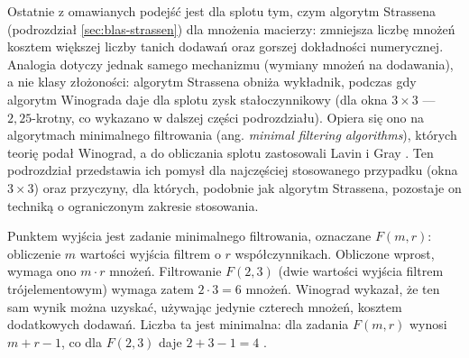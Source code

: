 \documentclass[a4paper,12pt]{book} %
\begin{document}
Ostatnie z omawianych podejść jest dla splotu tym, czym algorytm Strassena (podrozdział \ref{sec:blas-strassen}) dla mnożenia macierzy: zmniejsza liczbę mnożeń kosztem większej liczby tanich dodawań oraz gorszej dokładności numerycznej. Analogia dotyczy jednak samego mechanizmu (wymiany mnożeń na dodawania), a nie klasy złożoności: algorytm Strassena obniża wykładnik, podczas gdy algorytm Winograda daje dla splotu zysk stałoczynnikowy (dla okna $3 \times 3$ --- $2{,}25$-krotny, co wykazano w dalszej części podrozdziału). Opiera się ono na algorytmach minimalnego filtrowania (ang. \emph{minimal filtering algorithms}), których teorię podał Winograd, a do obliczania splotu zastosowali Lavin i Gray \cite{lavin2016fast,winograd1980arithmetic}. Ten podrozdział przedstawia ich pomysł dla najczęściej stosowanego przypadku (okna $3 \times 3$) oraz przyczyny, dla których, podobnie jak algorytm Strassena, pozostaje on techniką o ograniczonym zakresie stosowania.

Punktem wyjścia jest zadanie minimalnego filtrowania, oznaczane $F(m, r)$: obliczenie $m$ wartości wyjścia filtrem o $r$ współczynnikach. Obliczone wprost, wymaga ono $m \cdot r$ mnożeń. Filtrowanie $F(2, 3)$ (dwie wartości wyjścia filtrem trójelementowym) wymaga zatem $2 \cdot 3 = 6$ mnożeń. Winograd wykazał, że ten sam wynik można uzyskać, używając jedynie czterech mnożeń, kosztem dodatkowych dodawań. Liczba ta jest minimalna: dla zadania $F(m, r)$ wynosi $m + r - 1$, co dla $F(2, 3)$ daje $2 + 3 - 1 = 4$ \cite{lavin2016fast,winograd1980arithmetic}.
\end{document}
